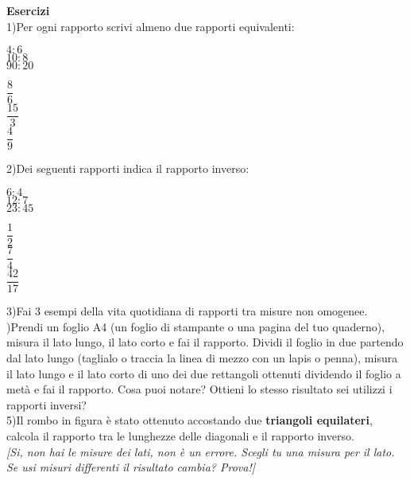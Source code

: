 \documentclass[14pt]{extarticle}
\begin{document}
\large{\textbf{Esercizi}}\\
1)Per ogni rapporto scrivi almeno due rapporti equivalenti:\\
\begin{minipage}[t]{0.5\textwidth}
    \(4:6\)\\
    \(10:8\)\\
    \(90:20\)\\
\end{minipage}
\begin{minipage}[t]{0.5\textwidth}
    \begin{spacing}{2.1}
    \(\dfrac{8}{6}\)\\
    \(\dfrac{15}{3}\)\\
    \(\dfrac{4}{9}\)\\
    \end{spacing}
\end{minipage}
2)Dei seguenti rapporti indica il rapporto inverso:\\
\begin{minipage}[t]{0.5\textwidth}
    \(6:4\)\\
    \(12:7\)\\
    \(23:45\)\\
\end{minipage}
\begin{minipage}[t]{0.5\textwidth}
    \begin{spacing}{2.1}
    \(\dfrac{1}{2}\)\\
    \(\dfrac{7}{4}\)\\
    \(\dfrac{42}{17}\)\\
    \end{spacing}
\end{minipage}
3)Fai 3 esempi della vita quotidiana di rapporti tra misure non omogenee.\\

)Prendi un foglio A4 (un foglio di stampante o una pagina del tuo quaderno), misura il lato lungo, il lato corto e fai il rapporto. Dividi il foglio in due partendo dal lato lungo (taglialo o traccia la linea di mezzo con un lapis o penna), misura il lato lungo e il lato corto di uno dei due rettangoli ottenuti dividendo il foglio a metà e fai il rapporto. Cosa puoi notare? Ottieni lo stesso risultato sei utilizzi i rapporti inversi?\\

5)Il rombo in figura è stato ottenuto accostando due \textbf{triangoli equilateri}, calcola il rapporto tra le lunghezze delle diagonali e il rapporto inverso.\\ \small{\textit{[Si, non hai le misure dei lati, non è un errore. Scegli tu una misura per il lato. Se usi misuri differenti il risultato cambia? Prova!]}} \\
\hspace{0.5cm}
\end{document}
